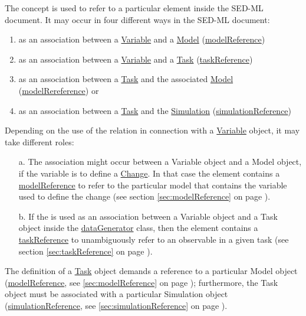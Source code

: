 \label{sec:reference}

The  concept is used to refer to a particular element inside the SED-ML document. It may occur in four different ways in the SED-ML document:
\begin{enumerate}
\item{as an association between a \hyperref[class:variable]{Variable} and a \hyperref[class:model]{Model} (\hyperref[sec:modelReference]{modelReference})}
\item{as an association between a \hyperref[class:variable]{Variable} and a \hyperref[class:task]{Task} (\hyperref[sec:taskReference]{taskReference})}
\item{as an association between a \hyperref[class:task]{Task} and the associated \hyperref[class:model]{Model} (\hyperref[sec:modelReference]{modelRereference}) or}
\item{as an association between a \hyperref[class:task]{Task} and the \hyperref[class:simulation]{Simulation} (\hyperref[sec:simulationReference]{simulationReference})}
\end{enumerate}

Depending on the use of the  relation in connection with a \hyperref[class:variable]{Variable} object, it may take different roles: 
\begin{enumerate}
\item[a.]{The  association might occur between a Variable object and a Model object, if the variable is to define a \hyperref[class:change]{Change}. 
In that case the  element contains a \hyperref[sec:modelReference]{modelReference} to refer to the particular model that contains the variable used to define the change (see section \ref{sec:modelReference} on page \pageref{sec:modelReference}). }
\item[b.]{If the  is used as an association between a Variable object and a Task object  inside the \hyperref[class:dataGenerator]{dataGenerator} class, then the  element contains a \hyperref[sec:taskReference]{taskReference} to unambiguously refer to an observable in a given task (see section \ref{sec:taskReference} on page \pageref{sec:taskReference}).}
\end{enumerate}

The definition of a \hyperref[class:task]{Task} object demands a reference to a particular Model object (\hyperref[sec:modelReference]{modelReference}, see \ref{sec:modelReference} on page \pageref{sec:modelReference}); furthermore, the Task object must be associated with a particular Simulation object (\hyperref[sec:simulationReference]{simulationReference}, see \ref{sec:simulationReference} on page \pageref{sec:simulationReference}).


